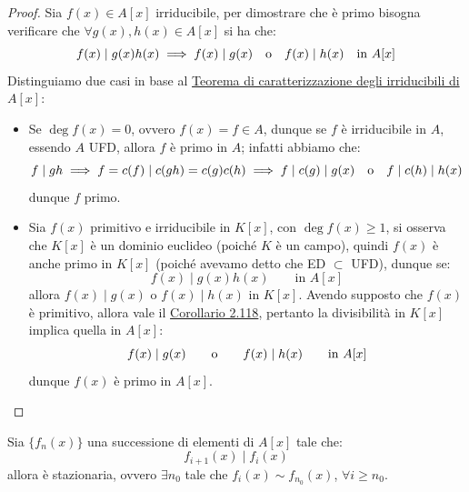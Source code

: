 \documentclass[11pt]{scrartcl}
\begin{document}
\begin{proof}
    Sia $f(x) \in A[x]$ irriducibile, per dimostrare che è primo bisogna verificare che $\forall g(x),h(x) \in A[x]$ si ha che:
    \[ f(x) \mid g(x)h(x) \implies f(x) \mid g(x) \quad \text o \quad f(x) \mid h(x) \quad \text{in $A[x]$}
        \]
    Distinguiamo due casi in base al \hyperref[carattirr]{Teorema di caratterizzazione degli irriducibili di $A[x]$}:
    \begin{itemize}
        \item Se $\deg f(x) = 0$, ovvero $f(x) = f \in A$, dunque se $f$ è irriducibile in $A$, essendo $A$ UFD, allora $f$ è primo in $A$;
        infatti abbiamo che:
        \[ f \mid gh \implies f = c(f) \mid c(gh) = c(g)c(h) \implies f \mid c(g) \mid g(x) \quad \text o \quad f \mid c(h) \mid h(x)
            \]
        dunque $f$ primo.
        \item Sia $f(x)$ primitivo e irriducibile in $K[x]$, con $\deg f(x) \geq 1$, si osserva che $K[x]$ è un dominio euclideo (poiché $K$ è un campo), quindi $f(x)$ è anche primo
        in $K[x]$ (poiché avevamo detto che ED $\subset$ UFD), dunque se:
        \[ f(x) \mid g(x)h(x) \qquad \text{in $A[x]$}
            \]
        allora $f(x) \mid g(x)$ o $f(x) \mid h(x)$ in $K[x]$. Avendo supposto che $f(x)$ è primitivo, allora vale il \hyperref[2.118]{Corollario 2.118}, pertanto la divisibilità in $K[x]$ implica quella in $A[x]$:
        \[ f(x) \mid g(x) \qquad \text o \qquad f(x) \mid h(x) \qquad \text{in $A[x]$}
            \]
        dunque $f(x)$ è primo in $A[x]$.
    \end{itemize}
\end{proof}

\begin{proposition}
    Sia $\{f_n(x)\}$ una successione di elementi di $A[x]$ tale che:
    \[ f_{i+1}(x) \mid f_i(x)
        \]
    allora è stazionaria, ovvero $\exists n_0$ tale che $f_i(x) \sim f_{n_0}(x)$, $\forall i \geq n_0$.
\end{proposition}
\end{document}
